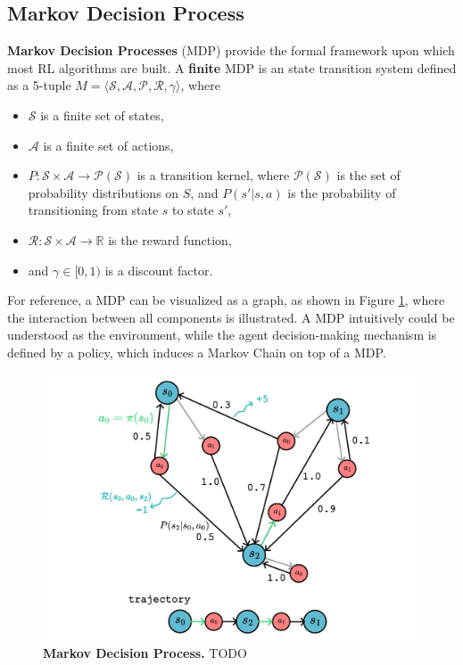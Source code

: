\subsection{Markov Decision Process}
\label{sec:mdp_definition}

\textbf{Markov Decision Processes} (MDP) provide the formal framework upon which most RL algorithms are built. A \textbf{finite} MDP is an state transition system defined as a 5-tuple $M = \langle \mathcal{S}, \mathcal{A}, \mathcal{P}, \mathcal{R}, \gamma \rangle$, where 

\begin{itemize}
    \item $\mathcal{S}$ is a finite set of states,
    \item $\mathcal{A}$ is a finite set of actions,
    \item $P : \mathcal{S} \times \mathcal{A} \rightarrow \mathcal{P(S)}$ is a transition kernel, where $\mathcal{P(S)}$ is the set of probability distributions on $S$, and $P(s'|s, a)$ is the probability of transitioning from state $s$ to state $s'$,
    \item $\mathcal{R} : \mathcal{S} \times \mathcal{A}  \rightarrow \mathbb{R}$ is the reward function,
    \item and $\gamma \in [0, 1)$ is a discount factor.
\end{itemize}

For reference, a MDP can be visualized as a graph, as shown in Figure \ref{fig:mdp}, where the interaction between all components is illustrated. A MDP intuitively could be understood as the environment, while the agent decision-making mechanism is defined by a policy, which induces a Markov Chain on top of a MDP.

\begin{figure}[H]
    \centering
    \includegraphics[width=1\linewidth]{Figures/mdp.jpg}
    \caption[Markov Decision Process]{\textbf{Markov Decision Process.} TODO}
    \label{fig:mdp}
\end{figure}


